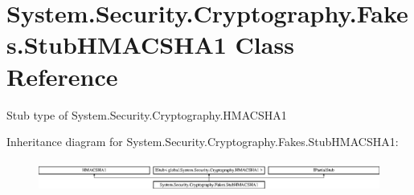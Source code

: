 \hypertarget{class_system_1_1_security_1_1_cryptography_1_1_fakes_1_1_stub_h_m_a_c_s_h_a1}{\section{System.\-Security.\-Cryptography.\-Fakes.\-Stub\-H\-M\-A\-C\-S\-H\-A1 Class Reference}
\label{class_system_1_1_security_1_1_cryptography_1_1_fakes_1_1_stub_h_m_a_c_s_h_a1}
}


Stub type of System.\-Security.\-Cryptography.\-H\-M\-A\-C\-S\-H\-A1 


Inheritance diagram for System.\-Security.\-Cryptography.\-Fakes.\-Stub\-H\-M\-A\-C\-S\-H\-A1\-:\begin{figure}[H]
\begin{center}
\leavevmode
\includegraphics[height=1.042830cm]{class_system_1_1_security_1_1_cryptography_1_1_fakes_1_1_stub_h_m_a_c_s_h_a1}
\end{center}
\end{figure}

